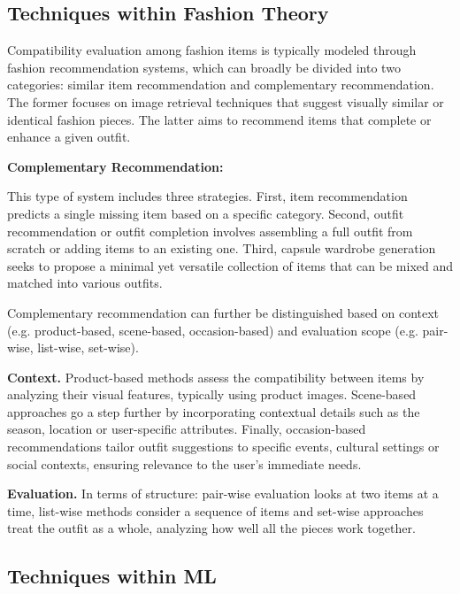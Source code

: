 \subsection{Techniques within Fashion Theory}

Compatibility evaluation among fashion items is typically modeled through fashion recommendation systems, which can broadly be divided into two categories: similar item recommendation and complementary recommendation. The former focuses on image retrieval techniques that suggest visually similar or identical fashion pieces. The latter aims to recommend items that complete or enhance a given outfit. \cite[cf.]{shirkhani_study_2023}

\vspace{0.5cm}

\textbf{Complementary Recommendation:}

\vspace{0.5cm}

This type of system includes three strategies. First, item recommendation predicts a single missing item based on a specific category. Second, outfit recommendation or outfit completion involves assembling a full outfit from scratch or adding items to an existing one. Third, capsule wardrobe generation seeks to propose a minimal yet versatile collection of items that can be mixed and matched into various outfits.

Complementary recommendation can further be distinguished based on context (e.g. product-based, scene-based, occasion-based) and evaluation scope (e.g. pair-wise, list-wise, set-wise).

\textbf{Context.}
Product-based methods assess the compatibility between items by analyzing their visual features, typically using product images. Scene-based approaches go a step further by incorporating contextual details such as the season, location or user-specific attributes. Finally, occasion-based recommendations tailor outfit suggestions to specific events, cultural settings or social contexts, ensuring relevance to the user's immediate needs.

\textbf{Evaluation.}
In terms of structure: pair-wise evaluation looks at two items at a time, list-wise methods consider a sequence of items and set-wise approaches treat the outfit as a whole, analyzing how well all the pieces work together.

\subsection{Techniques within \acs{ML}}

